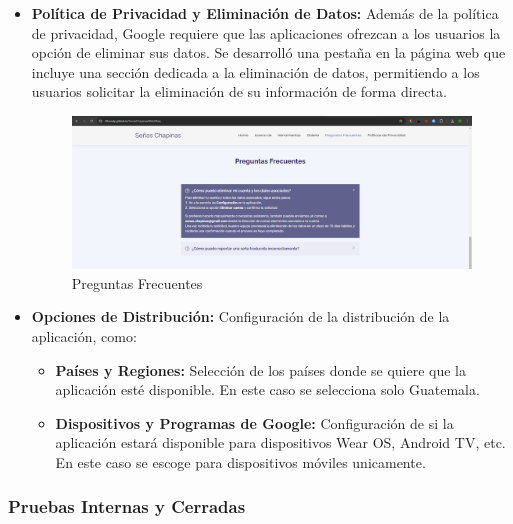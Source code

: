 \begin{itemize}
    \item \textbf{Política de Privacidad y Eliminación de Datos:} Además de la política de privacidad, Google requiere que las aplicaciones ofrezcan a los usuarios la opción de eliminar sus datos. Se desarrolló una pestaña en la página web que incluye una sección dedicada a la eliminación de datos, permitiendo a los usuarios solicitar la eliminación de su información de forma directa.

    \begin{figure} [H]
        \centering
        \includegraphics[width=1\linewidth]{figuras/pagina_web_preguntas.png}
        \caption{Preguntas Frecuentes}
        \label{fig:enter-label}
    \end{figure}
        
        
    \item \textbf{Opciones de Distribución:} Configuración de la distribución de la aplicación, como:
    \begin{itemize}
        \item \textbf{Países y Regiones:} Selección de los países donde se quiere que la aplicación esté disponible. En este caso se selecciona solo Guatemala. 
        \item \textbf{Dispositivos y Programas de Google:} Configuración de si la aplicación estará disponible para dispositivos Wear OS, Android TV, etc. En este caso se escoge para dispositivos móviles unicamente. 
    \end{itemize}
\end{itemize}

\subsubsection{Pruebas Internas y Cerradas}


